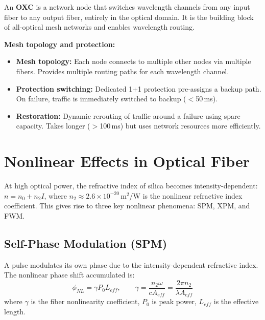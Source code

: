 \documentclass[12pt,a4paper]{article}
\begin{document}
\begin{tcolorbox}[defbox, title={\textbf{Optical Cross-Connect (OXC)}}]
An \textbf{OXC} is a network node that switches wavelength channels from any input fiber to any output fiber, entirely in the optical domain. It is the building block of all-optical mesh networks and enables wavelength routing.
\end{tcolorbox}

\textbf{Mesh topology and protection:}
\begin{itemize}[leftmargin=*, itemsep=3pt]
  \item \textbf{Mesh topology:} Each node connects to multiple other nodes via multiple fibers. Provides multiple routing paths for each wavelength channel.
  \item \textbf{Protection switching:} Dedicated 1+1 protection pre-assigns a backup path. On failure, traffic is immediately switched to backup ($<$50\,ms).
  \item \textbf{Restoration:} Dynamic rerouting of traffic around a failure using spare capacity. Takes longer ($>$100\,ms) but uses network resources more efficiently.
\end{itemize}

\section{Nonlinear Effects in Optical Fiber}

\begin{tcolorbox}[defbox, title={\textbf{Nonlinear Effects in Fiber}}]
At high optical power, the refractive index of silica becomes intensity-dependent: $n = n_0 + n_2 I$, where $n_2 \approx 2.6\times10^{-20}$\,m$^2$/W is the nonlinear refractive index coefficient. This gives rise to three key nonlinear phenomena: SPM, XPM, and FWM.
\end{tcolorbox}

\subsection{Self-Phase Modulation (SPM)}
A pulse modulates its own phase due to the intensity-dependent refractive index. The nonlinear phase shift accumulated is:
\[
\phi_{NL} = \gamma P_0 L_{eff}, \qquad \gamma = \frac{n_2 \omega}{c A_{eff}} = \frac{2\pi n_2}{\lambda A_{eff}}
\]
where $\gamma$ is the fiber nonlinearity coefficient, $P_0$ is peak power, $L_{eff}$ is the effective length.
\end{document}
